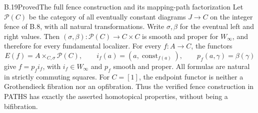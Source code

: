 \begin{claim}{B.19}{Proved}{The full fence construction and its mapping-path factorization}
Let $\mathcal P(C)$ be the category of all eventually constant diagrams
$J\to C$ on the integer fence of B.8, with all natural transformations.
Write $\sigma,\beta$ for the eventual left and right values. Then
$(\sigma,\beta):\mathcal P(C)\to C\times C$ is smooth and proper
for $W_\infty$, and therefore for every fundamental localizer.
For every $f:A\to C$, the functors
\[
 E(f)=A\times_{C,\sigma}\mathcal P(C),\qquad
 i_f(a)=(a,\operatorname{const}_{f(a)}),\qquad
 p_f(a,\gamma)=\beta(\gamma)
\]
give $f=p_fi_f$, with $i_f\in W_\infty$ and $p_f$ smooth and proper.
All formulas are natural in strictly commuting squares.
For $C=[1]$, the endpoint functor is neither a Grothendieck fibration nor
an opfibration. Thus the verified fence construction in PATHS has exactly
the asserted homotopical properties, without being a bifibration.
\end{claim}

